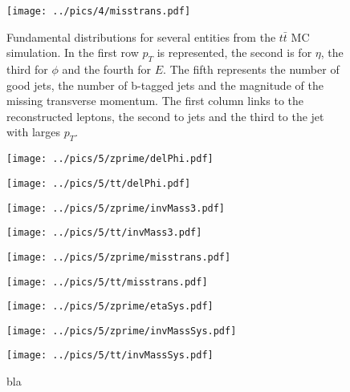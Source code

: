 \begin{figure}
\begin{minipage}{0.32\textwidth}
\end{minipage}
\begin{minipage}{0.32\textwidth}
 \texttt{[image: ../pics/4/misstrans.pdf]}
\end{minipage}
\caption{\small{Fundamental distributions for several entities from the $t\bar t$ MC simulation. In the first row $p_T$ is represented, the second is for $\eta$, the third for $\phi$ and
the fourth for $E$. The fifth represents the number of good jets, the number of b-tagged jets and the magnitude of the missing transverse momentum.
The first column links to the reconstructed leptons, the second to jets and the third to the jet with larges $p_T$.}}
\label{pic:fundamental}
\end{figure}

\begin{figure}
\begin{center}
\begin{minipage}{\minwidth\textwidth}
 \texttt{[image: ../pics/5/zprime/delPhi.pdf]}
\end{minipage}
\begin{minipage}{\minwidth\textwidth}
 \texttt{[image: ../pics/5/tt/delPhi.pdf]}
\end{minipage}

\begin{minipage}{\minwidth\textwidth}
 \texttt{[image: ../pics/5/zprime/invMass3.pdf]}
\end{minipage}
\begin{minipage}{\minwidth\textwidth}
 \texttt{[image: ../pics/5/tt/invMass3.pdf]}
\end{minipage}

\begin{minipage}{\minwidth\textwidth}
 \texttt{[image: ../pics/5/zprime/misstrans.pdf]}
\end{minipage}
\begin{minipage}{\minwidth\textwidth}
 \texttt{[image: ../pics/5/tt/misstrans.pdf]}
\end{minipage}

\begin{minipage}{\minwidth\textwidth}
 \texttt{[image: ../pics/5/zprime/etaSys.pdf]}
\end{minipage}
\begin{minipage}{\minwidth\textwidth}
\end{minipage}

\begin{minipage}{\minwidth\textwidth}
 \texttt{[image: ../pics/5/zprime/invMassSys.pdf]}
\end{minipage}
\begin{minipage}{\minwidth\textwidth}
 \texttt{[image: ../pics/5/tt/invMassSys.pdf]}
\end{minipage}
\end{center}
\caption{bla}
\label{pic:bla}
\end{figure}


